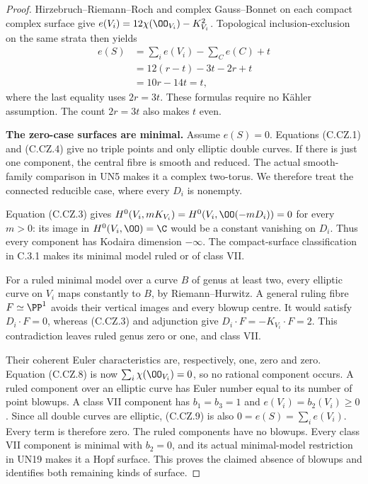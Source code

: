 \begin{proof}
Hirzebruch--Riemann--Roch and complex Gauss--Bonnet
on each compact complex surface give
$e(V_i)=12\chi(\OO_{V_i})-K_{V_i}^2$.
Topological inclusion-exclusion on the same strata
then yields
\[
 \begin{aligned}
 e(S)&=\sum_i e(V_i)-\sum_C e(C)+t\\
     &=12(r-t)-3t-2r+t\\
     &=10r-14t=t,
 \end{aligned}
\tag{C.CZ.9}
\]
where the last equality uses $2r=3t$.
These formulas require no K\"ahler assumption.
The count $2r=3t$ also makes $t$ even.

\par\medskip\noindent\textbf{The zero-case surfaces are minimal.}
Assume $e(S)=0$. Equations (C.CZ.1) and (C.CZ.4)
give no triple points and only elliptic double
curves. If there is just one component, the
central fibre is smooth and reduced. The
actual smooth-family comparison in UN5 makes
it a complex two-torus. We therefore treat
the connected reducible case, where every
$D_i$ is nonempty.

Equation (C.CZ.3) gives
$H^0(V_i,mK_{V_i})=H^0(V_i,\OO(-mD_i))=0$
for every $m>0$: its image in $H^0(V_i,\OO)=\C$
would be a constant vanishing on $D_i$.
Thus every component has Kodaira dimension
$-\infty$. The compact-surface classification
in C.3.1 makes its minimal model ruled or
of class VII.

For a ruled minimal model over a curve $B$
of genus at least two, every elliptic curve
on $V_i$ maps constantly to $B$, by
Riemann--Hurwitz. A general ruling fibre
$F\simeq\PP^1$ avoids their vertical images
and every blowup centre. It would satisfy
$D_i\cdot F=0$, whereas (C.CZ.3) and
adjunction give $D_i\cdot F=-K_{V_i}\cdot F=2$.
This contradiction leaves ruled genus zero
or one, and class VII.

Their coherent Euler characteristics are,
respectively, one, zero and zero. Equation
(C.CZ.8) is now $\sum_i\chi(\OO_{V_i})=0$,
so no rational component occurs. A ruled
component over an elliptic curve has Euler
number equal to its number of point blowups.
A class VII component has $b_1=b_3=1$ and
$e(V_i)=b_2(V_i)\ge0$. Since all double
curves are elliptic, (C.CZ.9) is also
$0=e(S)=\sum_i e(V_i)$. Every term is
therefore zero. The ruled components have
no blowups. Every class VII component is
minimal with $b_2=0$, and its actual
minimal-model restriction in UN19 makes
it a Hopf surface. This proves the claimed
absence of blowups and identifies both
remaining kinds of surface.


\end{proof}
